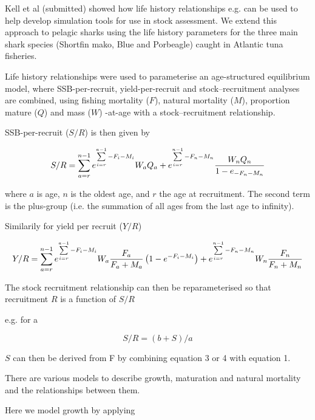 \documentclass[preprint,authoryear,12pt]{elsarticle}
\begin{document}
Kell et al (submitted) showed how life history relationships e.g. \citet{gislason2010does} can be used to help develop simulation tools for use
in stock assessment. We extend this approach to pelagic sharks using the life history parameters for the three main shark species 
(Shortfin mako, Blue and Porbeagle) caught in Atlantic tuna fisheries.
 
Life history relationships were used to parameterise an age-structured equilibrium model, where SSB-per-recruit, yield-per-recruit  
and stock–recruitment analyses are combined, using fishing mortality ($F$), natural mortality ($M$), proportion  
mature ($Q$) and mass ($W$) -at-age with a stock–recruitment relationship. 
 
SSB-per-recruit ($S/R$) is then given by 
 
\begin{equation} 
S/R=\sum\limits_{a=r}^{n-1} {e^{\sum\limits_{i=r}^{a-1} {-F_i-M_i}}} W_a Q_a + e^{\sum\limits_{i=r}^{n-1} {-F_n-M_n}} \frac{W_n Q_n}{1-e_{-F_n-M_n}}\\ 
\end{equation}  
 
where $a$ is age, $n$ is the oldest age, and $r$ the age at recruitment. The second term is the plus-group (i.e. the summation of all ages from the  
last age to infinity).  
 
Similarily for yield per recruit ($Y/R$) 
 
\begin{equation} 
Y/R=\sum\limits_{a=r}^{n-1} {e^{\sum\limits_{i=r}^{a-1} {-F_i-M_i}}} W_a\frac{F_a}{F_a+M_a}\left(1-e^{-F_i-M_i} \right) + e^{\sum\limits_{i=r}^{n-1} {-F_n-M_n}} W_n\frac{F_n}{F_n+M_n}\\ 
\end{equation}  
 
The stock recruitment relationship can then be reparameterised so that recruitment $R$ is a function of $S/R$ 
 
e.g. for a \citet{beverton1956review}  
 
\begin{equation} 
S/R=(b+S)/a 	 
\end{equation}  
 
$S$ can then be derived from F by combining equation 3 or 4 with equation 1.  
 
There are various models to describe growth, maturation and natural mortality and the relationships between them. 
 
Here we model growth by applying \citep{von1957quantitative}   
 
\end{document}
